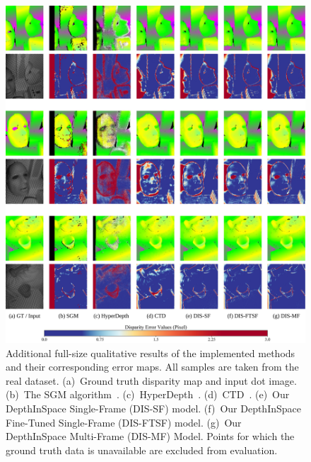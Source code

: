 \begin{figure}
    \begin{center}
        \includegraphics[width=1\linewidth]{images/chapter2/supp_figures/supp_results_4.jpg}
    \end{center}
   \caption{Additional full-size qualitative results of the implemented methods and their corresponding error maps. All samples are taken from the real dataset. (a)~Ground truth disparity map and input dot image. (b)~The SGM algorithm~\cite{hirschmuller2007stereo}. (c)~HyperDepth~\cite{ryan2016hyperdepth}. (d)~CTD~\cite{riegler2019connecting}. (e)~Our DepthInSpace Single-Frame (DIS-SF) model. (f)~Our DepthInSpace Fine-Tuned Single-Frame (DIS-FTSF) model. (g)~Our DepthInSpace Multi-Frame (DIS-MF) Model. Points for which the ground truth data is unavailable are excluded from evaluation.}
    \label{fig:c2_real_results}
\end{figure}

